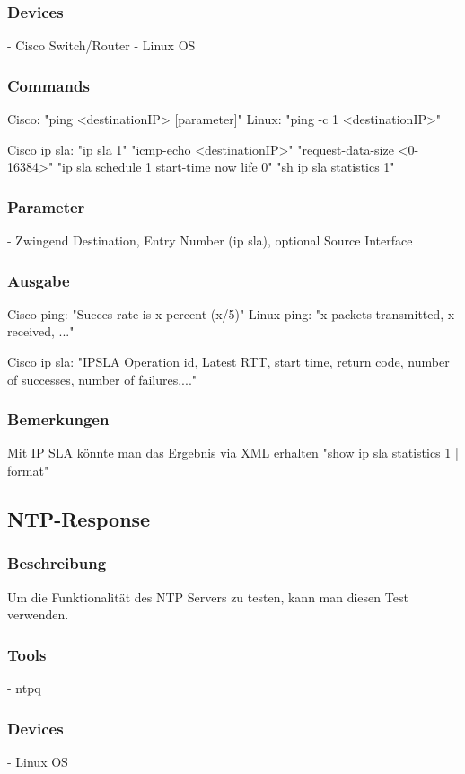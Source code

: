 \documentclass[a4,12pt]{scrartcl}
\begin{document}
\subsubsection{Devices}
- Cisco Switch/Router
- Linux OS
\subsubsection{Commands}
Cisco: "ping <destinationIP> [parameter]"
Linux: "ping -c 1 <destinationIP>"

Cisco ip sla: 	"ip sla 1"
			 	"icmp-echo <destinationIP>"
			  	"request-data-size <0-16384>"
			  	"ip sla schedule 1 start-time now life 0"
			  	"sh ip sla statistics 1"

\subsubsection{Parameter}
- Zwingend Destination, Entry Number (ip sla), optional Source Interface
\subsubsection{Ausgabe}
Cisco ping: "Succes rate is x percent (x/5)"
Linux ping: "x packets transmitted, x received, ..."

Cisco ip sla: "IPSLA Operation id, Latest RTT, start time, return code, number of successes, number of failures,..."

\subsubsection{Bemerkungen}
Mit IP SLA könnte man das Ergebnis via XML erhalten
"show ip sla statistics 1 | format"


\subsection{NTP-Response}
\subsubsection{Beschreibung}
Um die Funktionalität des NTP Servers zu testen, kann man diesen Test verwenden.
\subsubsection{Tools}
- ntpq
\subsubsection{Devices}
- Linux OS
\end{document}
